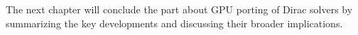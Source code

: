 
The next chapter will conclude the part about GPU porting of Dirac solvers by summarizing the key developments and discussing their broader implications.

